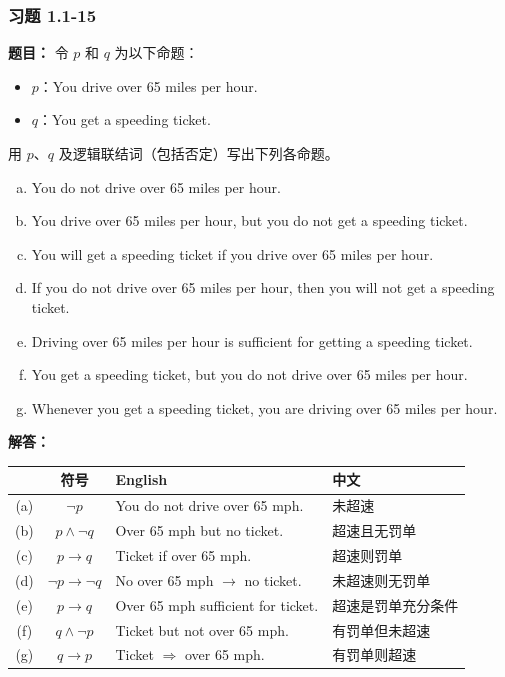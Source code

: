 \documentclass[11pt,UTF8]{article}
\begin{document}
\subsubsection*{习题 1.1-15}
\textbf{题目：} 令 $p$ 和 $q$ 为以下命题：
\begin{itemize}
    \item $p$：You drive over 65 miles per hour.
    \item $q$：You get a speeding ticket.
\end{itemize}
用 $p$、$q$ 及逻辑联结词（包括否定）写出下列各命题。
\begin{enumerate}[a)]
    \item You do not drive over 65 miles per hour.
    \item You drive over 65 miles per hour, but you do not get a speeding ticket.
    \item You will get a speeding ticket if you drive over 65 miles per hour.
    \item If you do not drive over 65 miles per hour, then you will not get a speeding ticket.
    \item Driving over 65 miles per hour is sufficient for getting a speeding ticket.
    \item You get a speeding ticket, but you do not drive over 65 miles per hour.
    \item Whenever you get a speeding ticket, you are driving over 65 miles per hour.
\end{enumerate}

\textbf{解答：}
\begin{center}
\begin{tabular}{c|c|l|l}
\hline
 & 符号 & English & 中文 \\
\hline
(a) & $\neg p$ & You do not drive over 65 mph. & 未超速 \\
(b) & $p \land \neg q$ & Over 65 mph but no ticket. & 超速且无罚单 \\
(c) & $p \to q$ & Ticket if over 65 mph. & 超速则罚单 \\
(d) & $\neg p \to \neg q$ & No over 65 mph $\to$ no ticket. & 未超速则无罚单 \\
(e) & $p \to q$ & Over 65 mph sufficient for ticket. & 超速是罚单充分条件 \\
(f) & $q \land \neg p$ & Ticket but not over 65 mph. & 有罚单但未超速 \\
(g) & $q \to p$ & Ticket $\Rightarrow$ over 65 mph. & 有罚单则超速 \\
\hline
\end{tabular}
\end{center}
\end{document}
